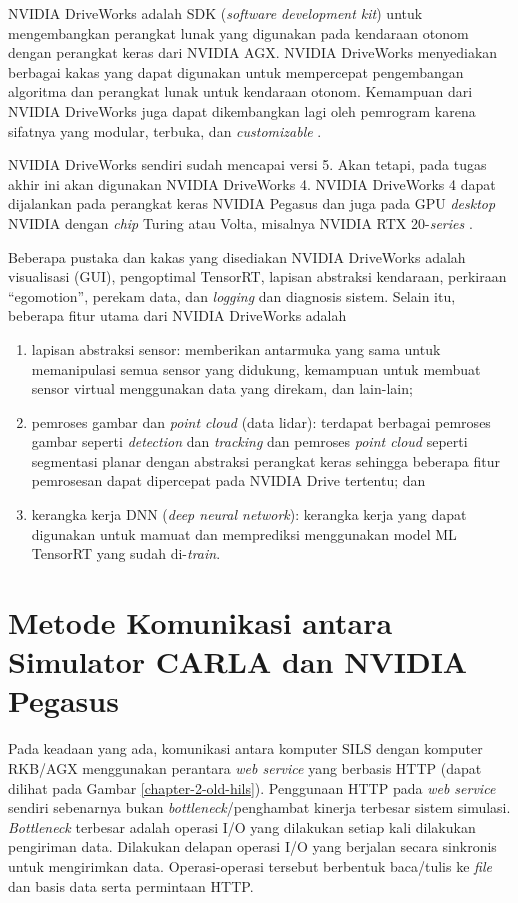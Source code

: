 NVIDIA DriveWorks adalah SDK (\textit{software development kit}) untuk
mengembangkan perangkat lunak yang digunakan pada kendaraan otonom dengan
perangkat keras dari NVIDIA AGX. NVIDIA DriveWorks menyediakan berbagai kakas yang
dapat  digunakan untuk mempercepat pengembangan algoritma dan perangkat lunak
untuk kendaraan otonom. Kemampuan dari NVIDIA DriveWorks juga dapat dikembangkan
lagi oleh pemrogram karena sifatnya yang modular, terbuka, dan
\textit{customizable} \parencite{nvidia_driveworksMainSite}.

NVIDIA DriveWorks sendiri sudah mencapai versi 5. Akan tetapi, pada tugas
akhir ini akan digunakan NVIDIA DriveWorks 4. NVIDIA DriveWorks 4 dapat
dijalankan pada perangkat keras  NVIDIA Pegasus dan juga pada GPU
\textit{desktop} NVIDIA dengan \textit{chip} Turing atau Volta, misalnya NVIDIA
RTX 20-\textit{series} \parencite{nvidia_driveworksSdkGettingStarted}.

Beberapa pustaka dan kakas yang disediakan NVIDIA DriveWorks adalah visualisasi
(GUI), pengoptimal TensorRT, lapisan abstraksi kendaraan, perkiraan
``egomotion'', perekam data, dan \textit{logging} dan diagnosis sistem. Selain
itu, beberapa fitur utama dari NVIDIA DriveWorks adalah
\begin{enumerate}
	\item lapisan abstraksi sensor: memberikan antarmuka yang sama untuk
	      memanipulasi semua sensor yang didukung, kemampuan untuk membuat sensor
	      virtual menggunakan data yang direkam, dan lain-lain;
	\item pemroses gambar dan \textit{point cloud} (data lidar): terdapat
	      berbagai pemroses gambar seperti \textit{detection} dan
	      \textit{tracking} dan pemroses \textit{point cloud} seperti segmentasi
	      planar dengan abstraksi perangkat keras sehingga beberapa fitur
	      pemrosesan dapat dipercepat pada NVIDIA Drive tertentu; dan
	\item kerangka kerja DNN (\textit{deep neural network}): kerangka kerja yang
	      dapat digunakan untuk mamuat dan memprediksi menggunakan model ML
	      TensorRT yang sudah di-\textit{train}.
\end{enumerate}

\section{Metode Komunikasi antara Simulator CARLA dan NVIDIA
  Pegasus}\label{chapter-2-section-comms}

Pada keadaan yang ada, komunikasi antara komputer SILS dengan komputer RKB/AGX
menggunakan perantara \textit{web service} yang berbasis HTTP (dapat dilihat
pada Gambar \ref{chapter-2-old-hils}). Penggunaan HTTP pada \textit{web service}
sendiri sebenarnya bukan \textit{bottleneck}/penghambat kinerja terbesar sistem
simulasi. \textit{Bottleneck} terbesar adalah operasi I/O yang dilakukan setiap
kali dilakukan pengiriman data. Dilakukan delapan operasi I/O yang berjalan
secara sinkronis untuk mengirimkan data. Operasi-operasi tersebut berbentuk
baca/tulis ke \textit{file} dan basis data serta permintaan HTTP.

